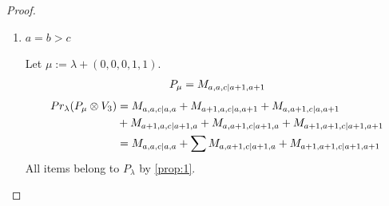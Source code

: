 \begin{proof}
\begin{enumerate}
    \item $a=b>c$ \par
        Let $\mu:=\lambda + (0,0,0,1,1) $.
        \begin{equation}\notag
          \begin{aligned}
            P_\mu = M_{a,a,c|a+1,a+1}
          \end{aligned}
        \end{equation}
        \begin{equation}\notag
          \begin{aligned}
            Pr_{\lambda}(P_\mu \otimes V_{3}) &=
M_{a,a,c|a,a}
+ M_{a+1,a,c|a,a+1}
+ M_{a,a+1,c|a,a+1}\\
                                              &
+ M_{a+1,a,c|a+1,a}
+ M_{a,a+1,c|a+1,a}
+ M_{a+1,a+1,c|a+1,a+1} \\
                                               &=
 M_{a,a,c|a,a}
+ \sum M_{a,a+1,c|a+1,a}
+  M_{a+1,a+1,c|a+1,a+1}
          \end{aligned}
        \end{equation}
All items belong to $P_\lambda$ by \cref{prop:1}.


\end{enumerate}
\end{proof}
